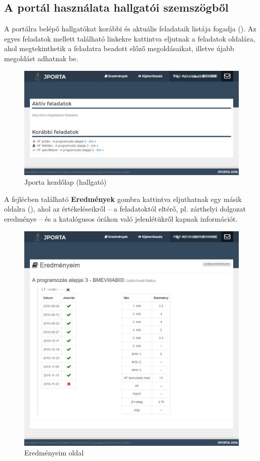 \subsection{A portál használata hallgatói szemszögből}
A portálra belépő hallgatókat korábbi és aktuális feladataik listája fogadja ().
Az egyes feladatok mellett található linkekre kattintva eljutnak a feladatok oldalára, ahol megtekinthetik a feladatra beadott előző megoldásaikat, illetve újabb megoldást adhatnak be.
\begin{figure}[h]
    \centering
    \includegraphics[width=\textwidth]{figures/Jporta-home-h}
    \caption{Jporta kezdőlap (hallgató)}
    \label{figure:jporta-home-h}
\end{figure}

A fejlécben található \textbf{Eredmények} gombra kattintva eljuthatnak egy másik oldalra (), ahol az értékeléseikről -- a feladatoktól eltérő, pl. zárthelyi dolgozat eredménye -- és a katalógusos órákon való jelenlétükről kapnak információt.
\begin{figure}[h]
    \centering
    \includegraphics[width=\textwidth]{figures/Jporta-results}
    \caption{Eredményeim oldal}
    \label{figure:jporta-results}
\end{figure}

